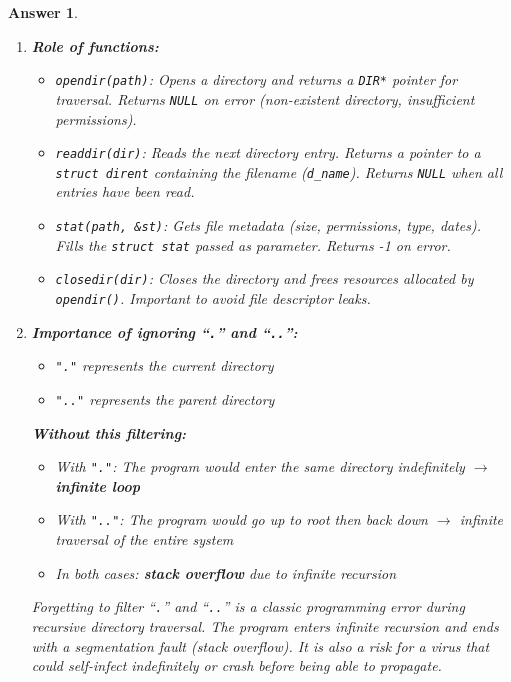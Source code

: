 \documentclass[a4paper,11pt]{article}
\theoremstyle{plain}
\newtheorem{correction}{Answer}
\theoremstyle{definition}
\begin{document}
\begin{correction}

\begin{enumerate}
\item \textbf{Role of functions:}

\begin{itemize}
\item \texttt{opendir(path)}: Opens a directory and returns a \texttt{DIR*} pointer for traversal. Returns \texttt{NULL} on error (non-existent directory, insufficient permissions).

\item \texttt{readdir(dir)}: Reads the next directory entry. Returns a pointer to a \texttt{struct dirent} containing the filename (\texttt{d\_name}). Returns \texttt{NULL} when all entries have been read.

\item \texttt{stat(path, \&st)}: Gets file metadata (size, permissions, type, dates). Fills the \texttt{struct stat} passed as parameter. Returns -1 on error.

\item \texttt{closedir(dir)}: Closes the directory and frees resources allocated by \texttt{opendir()}. Important to avoid file descriptor leaks.
\end{itemize}

\item \textbf{Importance of ignoring ``\texttt{.}'' and ``\texttt{..}'':}

\begin{itemize}
\item \texttt{"."} represents the current directory
\item \texttt{".."} represents the parent directory
\end{itemize}

\textbf{Without this filtering:}
\begin{itemize}
\item With \texttt{"."}: The program would enter the same directory indefinitely $\rightarrow$ \textbf{infinite loop}
\item With \texttt{".."}: The program would go up to root then back down $\rightarrow$ infinite traversal of the entire system
\item In both cases: \textbf{stack overflow} due to infinite recursion
\end{itemize}

\begin{attention}
Forgetting to filter ``\texttt{.}'' and ``\texttt{..}'' is a classic programming error during recursive directory traversal. The program enters infinite recursion and ends with a \textit{segmentation fault} (stack overflow). It is also a risk for a virus that could self-infect indefinitely or crash before being able to propagate.
\end{attention}


\end{enumerate}
\end{correction}
\end{document}
